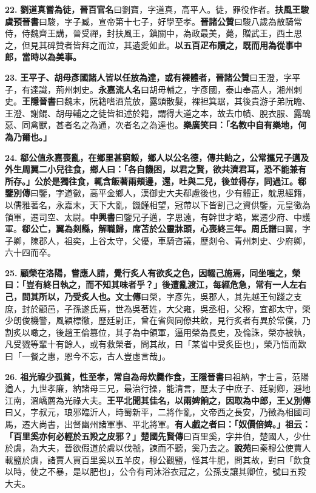 \textbf{22.} \textbf{劉道真嘗為徒，}{\footnotesize \textbf{晉百官名}曰劉寶，字道真，高平人。徒，罪役作者。}\textbf{扶風王駿}{\footnotesize \textbf{虞預晉書}曰駿，字子臧，宣帝第十七子，好學至孝。\textbf{晉諸公贊}曰駿八歲為散騎常侍，侍魏齊王講，晉受禪，封扶風王，鎮關中，為政最美，薨，贈武王，西土思之，但見其碑贊者皆拜之而泣，其遺愛如此。}\textbf{以五百疋布贖之，既而用為從事中郎，當時以為美事。}

\textbf{23.} \textbf{王平子、胡毋彥國諸人皆以任放為達，或有裸體者，}{\footnotesize \textbf{晉諸公贊}曰王澄，字平子，有達識，荊州刺史。\textbf{永嘉流人名}曰胡毋輔之，字彥國，泰山奉高人，湘州刺史。\textbf{王隱晉書}曰魏末，阮籍嗜酒荒放，露頭散髮，裸袒箕踞，其後貴游子弟阮瞻、王澄、謝鯤、胡毋輔之之徒皆祖述於籍，謂得大道之本，故去巾幘、脫衣服、露醜惡、同禽獸，甚者名之為通，次者名之為達也。}\textbf{樂廣笑曰：「名教中自有樂地，何為乃爾也。」}

\textbf{24.} \textbf{郗公值永嘉喪亂，在鄉里甚窮餒，鄉人以公名德，傳共飴之，公常攜兄子邁及外生周翼二小兒往食，鄉人曰：「各自饑困，以君之賢，欲共濟君耳，恐不能兼有所存。」公於是獨往食，輒含飯著兩頰邊，還，吐與二兒，後並得存，同過江。}{\footnotesize \textbf{郗鑒別傳}曰鑒，字道徽，高平金鄉人，漢御史大夫郗慮後也，少有體正，躭思經籍，以儒雅著名，永嘉末，天下大亂，饑饉相望，冠帶以下皆割己之資供鑒，元皇徵為領軍，遷司空、太尉。\textbf{中興書}曰鑒兄子邁，字思遠，有幹世才略，累遷少府、中護軍。}\textbf{郗公亡，翼為剡縣，解職歸，席苫於公靈牀頭，心喪終三年。}{\footnotesize \textbf{周氏譜}曰翼，字子卿，陳郡人，祖奕，上谷太守，父優，車騎咨議，歷剡令、青州刺史、少府卿，六十四而卒。}

\textbf{25.} \textbf{顧榮在洛陽，嘗應人請，覺行炙人有欲炙之色，因輟己施焉，同坐嗤之，榮曰：「豈有終日執之，而不知其味者乎？」後遭亂渡江，每經危急，常有一人左右己，問其所以，乃受炙人也。}{\footnotesize \textbf{文士傳}曰榮，字彥先，吳郡人，其先越王句踐之支庶，封於顧邑，子孫遂氏焉，世為吳著姓，大父雍，吳丞相，父穆，宜都太守，榮少朗俊機警，風穎標徹，歷廷尉正，曾在省與同僚共飲，見行炙者有異於常僕，乃割炙以噉之，後趙王倫篡位，其子為中領軍，逼用榮為長史，及倫誅，榮亦被執，凡受戮等輩十有餘人，或有救榮者，問其故，曰「某省中受炙臣也」，榮乃悟而歎曰「一餐之惠，恩今不忘，古人豈虛言哉」。}

\textbf{26.} \textbf{祖光祿少孤貧，性至孝，常自為母炊爨作食，}{\footnotesize \textbf{王隱晉書}曰祖納，字士言，范陽遒人，九世孝廉，納諸母三兄，最治行操，能清言，歷太子中庶子、廷尉卿，避地江南，溫嶠薦為光祿大夫。}\textbf{王平北聞其佳名，以兩婢餉之，因取為中郎，}{\footnotesize \textbf{王乂別傳}曰乂，字叔元，琅邪臨沂人，時蜀新平，二將作亂，文帝西之長安，乃徵為相國司馬，遷大尚書，出督幽州諸軍事、平北將軍。}\textbf{有人戲之者曰：「奴價倍婢。」祖云：「百里奚亦何必輕於五羖之皮邪？」}{\footnotesize \textbf{楚國先賢傳}曰百里奚，字井伯，楚國人，少仕於虞，為大夫，晉欲假道於虞以伐虢，諫而不聽，奚乃去之。\textbf{說苑}曰秦穆公使賈人載鹽於虞，諸賈人買百里奚以五羊皮，穆公觀鹽，怪其牛肥，問其故，對曰「飲食以時，使之不暴，是以肥也」，公令有司沐浴衣冠之，公孫支讓其卿位，號曰五羖大夫。}

